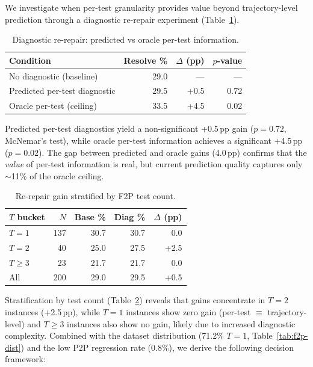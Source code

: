 \documentclass[11pt,a4paper]{article}
\begin{document}
We investigate when per-test granularity provides value beyond trajectory-level prediction through a diagnostic re-repair experiment (Table~\ref{tab:rerepair}).

\begin{table}[t]
\centering
\small
\begin{tabular}{lrrr}
\toprule
\textbf{Condition} & \textbf{Resolve \%} & \textbf{$\Delta$ (pp)} & \textbf{$p$-value} \\
\midrule
No diagnostic (baseline) & 29.0 & --- & --- \\
Predicted per-test diagnostic & 29.5 & +0.5 & 0.72 \\
Oracle per-test (ceiling) & 33.5 & +4.5 & 0.02 \\
\bottomrule
\end{tabular}
\caption{Diagnostic re-repair: predicted vs oracle per-test information.}
\label{tab:rerepair}
\end{table}

Predicted per-test diagnostics yield a non-significant +0.5\,pp gain ($p=0.72$, McNemar's test), while oracle per-test information achieves a significant +4.5\,pp ($p=0.02$).
The gap between predicted and oracle gains (4.0\,pp) confirms that the \emph{value} of per-test information is real, but current prediction quality captures only $\sim$11\% of the oracle ceiling.

\begin{table}[t]
\centering
\small
\begin{tabular}{lrrrr}
\toprule
$T$ \textbf{bucket} & \textbf{$N$} & \textbf{Base \%} & \textbf{Diag \%} & \textbf{$\Delta$ (pp)} \\
\midrule
$T=1$ & 137 & 30.7 & 30.7 & 0.0 \\
$T=2$ & 40 & 25.0 & 27.5 & +2.5 \\
$T\ge3$ & 23 & 21.7 & 21.7 & 0.0 \\
All & 200 & 29.0 & 29.5 & +0.5 \\
\bottomrule
\end{tabular}
\caption{Re-repair gain stratified by F2P test count.}
\label{tab:rerepair-strat}
\end{table}

Stratification by test count (Table~\ref{tab:rerepair-strat}) reveals that gains concentrate in $T\!=\!2$ instances (+2.5\,pp), while $T\!=\!1$ instances show zero gain (per-test $\equiv$ trajectory-level) and $T\!\ge\!3$ instances also show no gain, likely due to increased diagnostic complexity.
Combined with the dataset distribution (71.2\% $T\!=\!1$, Table~\ref{tab:f2p-dist}) and the low P2P regression rate (0.8\%), we derive the following decision framework:
\end{document}
